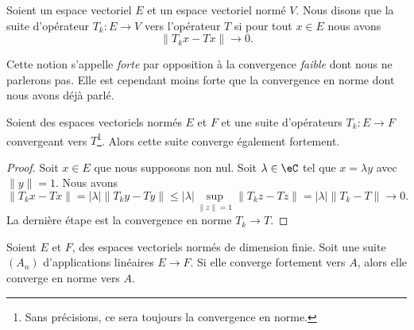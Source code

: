 \begin{definition}       \label{DEFooNREQooElLvec}
	Soient un espace vectoriel \( E\) et un espace vectoriel normé \( V\). Nous disons que la suite d'opérateur \( T_k\colon E\to V\)  vers l'opérateur \( T\) si pour tout \( x\in E\) nous avons
	\begin{equation}
		\| T_kx-Tx \|\to 0.
	\end{equation}
\end{definition}

Cette notion s'appelle \emph{forte} par opposition à la convergence \emph{faible} dont nous ne parlerons pas. Elle est cependant moins forte que la convergence en norme dont nous avons déjà parlé.

\begin{proposition}     \label{PROPooRFBLooUjSirP}
	Soient des espaces vectoriels normés \( E\) et \( F\) et une suite d'opérateurs \( T_k\colon E\to F\) convergeant vers \( T\)\footnote{Sans précisions, ce sera toujours la convergence en norme.}. Alors cette suite converge également fortement.
\end{proposition}

\begin{proof}
	Soit \( x\in E\) que nous supposons non nul. Soit \( \lambda\in \eC\) tel que \( x=\lambda y\) avec \( \| y \|=1\). Nous avons
	\begin{equation}
		\| T_kx-Tx \|=| \lambda |\| T_ky-Ty \|\leq | \lambda |\sup_{\| z \|=1}\| T_kz-Tz \|=| \lambda |\| T_k-T \|\to 0.
	\end{equation}
	La dernière étape est la convergence en norme \( T_k\to T\).
\end{proof}

\begin{proposition}     \label{PROPooESZVooJNCidk}
	Soient \( E\) et \( F\), des espaces vectoriels normés de dimension finie. Soit une suite \( (A_n)\) d'applications linéaires \( E\to F\). Si elle converge fortement vers \( A\), alors elle converge en norme vers \( A\).
\end{proposition}

